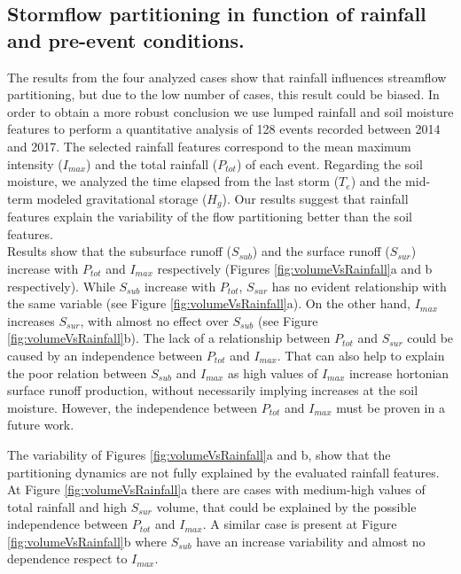 \documentclass[preprint,12pt]{elsarticle}
\begin{document}
\subsection{Stormflow partitioning in function of rainfall and pre-event conditions.}

The results from the four analyzed cases show that rainfall influences streamflow partitioning, but due to the low number of cases, this result could be biased.   In order to obtain a more robust conclusion we use lumped rainfall and soil moisture features to perform a quantitative analysis of 128 events recorded between 2014 and 2017. The selected rainfall features correspond to the mean maximum intensity ($I_{max}$) and the total rainfall ($P_{tot}$) of each event.  Regarding the soil moisture, we analyzed the time elapsed from the last storm ($T_e$) and the mid-term modeled gravitational storage ($H_g$).  Our results suggest that rainfall features explain the variability of the flow partitioning better than the soil features.\\   

Results show that the subsurface runoff ($S_{sub}$) and the surface runoff ($S_{sur}$) increase with $P_{tot}$ and $I_{max}$ respectively (Figures \ref{fig:volumeVsRainfall}a and b respectively).  While $S_{sub}$ increase with $P_{tot}$, $S_{sur}$ has no evident relationship with the same variable (see Figure \ref{fig:volumeVsRainfall}a).  On the other hand, $I_{max}$ increases $S_{sur}$, with almost no effect over $S_{sub}$ (see Figure \ref{fig:volumeVsRainfall}b). The lack of a relationship between  $P_{tot}$ and $S_{sur}$ could be caused by an independence between $P_{tot}$ and $I_{max}$. That can also help to explain the poor relation between $S_{sub}$ and $I_{max}$ as high values of $I_{max}$ increase hortonian surface runoff production, without necessarily implying increases at the soil moisture.  However, the independence between $P_{tot}$ and $I_{max}$ must be proven in a future work. 

The variability of Figures \ref{fig:volumeVsRainfall}a and b, show that the partitioning dynamics are not fully explained by the evaluated rainfall features.  At Figure \ref{fig:volumeVsRainfall}a there are cases with medium-high values of total rainfall and high $S_{sur}$ volume, that could be explained by the possible independence between $P_{tot}$ and $I_{max}$.  A similar case is present at Figure \ref{fig:volumeVsRainfall}b where $S_{sub}$ have an increase variability and almost no dependence respect to $I_{max}$.\\
\end{document}
